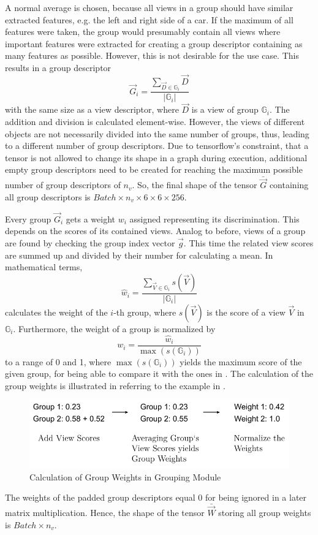 A normal average is chosen, because all views in a group should have similar extracted features, e.g. the left and right side of a car.
If the maximum of all features were taken, the group would presumably contain all views where important features were extracted for creating a group descriptor containing as many features as possible.
However, this is not desirable for the use case.
This results in a group descriptor
\begin{equation}
	\vec{G}_i = \frac{\sum_{\vec{D} \in \mathbb{G}_i} \vec{D}}{|\mathbb{G}_i|}
\end{equation}
with the same size as a view descriptor, where $\vec{D}$ is a view of group $\mathbb{G}_i$. The addition and division is calculated element-wise.
However, the views of different objects are not necessarily divided into the same number of groups, thus, leading to a different number of group descriptors.
Due to tensorflow's constraint, that a tensor is not allowed to change its shape in a graph during execution, additional empty group descriptors need to be created for reaching the maximum possible number of group descriptors of $n_v$.
So, the final shape of the tensor $\bar{\vec{G}}$ containing all group descriptors is $Batch \times n_v \times 6 \times 6 \times 256$.

Every group $\vec{G}_i$ gets a weight $w_i$ assigned representing its discrimination.
This depends on the scores of its contained views.
Analog to before, views of a group are found by checking the group index vector $\vec{g}$.
This time the related view scores are summed up and divided by their number for calculating a mean.
In mathematical terms,
\begin{equation}
	\hat{w}_i = \frac{\sum_{\vec{V} \in \mathbb{G}_i} s(\vec{V})}{|\mathbb{G}_i|}
\end{equation}
calculates the weight of the $i$-th group, where $s(\vec{V})$ is the score of a view $\vec{V}$ in $\mathbb{G}_i$.
Furthermore, the weight of a group is normalized by
\begin{equation}
	w_i = \frac{\hat{w}_i}{\max(s(\mathbb{G}_i))}
\end{equation}
to a range of 0 and 1, where $\max(s(\mathbb{G}_i))$ yields the maximum score of the given group, for being able to compare it with the ones in \cite{Feng2018}.
The calculation of the group weights is illustrated in  referring to the example in .
\begin{figure}
	\centering
	\includegraphics[]{images/grouping_module_weights.pdf}
	\caption{Calculation of Group Weights in Grouping Module}
	\label{fig:grouping-module-weights}
\end{figure}
The weights of the padded group descriptors equal 0 for being ignored in a later matrix multiplication.
Hence, the shape of the tensor $\bar{\vec{W}}$ storing all group weights is $Batch \times n_v$.